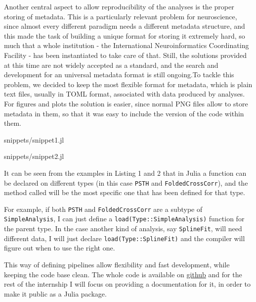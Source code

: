 Another central aspect to allow reproducibility of the analyses is the proper storing of metadata. This is a particularly relevant problem for neuroscience, since almost every different paradigm needs a different metadata structure, and this made the task of building a unique format for storing it extremely hard, so much that a whole institution - the International Neuroinformatics Coordinating Facility - has been instantiated to take care of that. Still, the solutions provided at this time are not widely accepted as a standard, and the search and development for an universal metadata format is still ongoing.To tackle this problem, we decided to keep the most flexible format for metadata, which is plain text files, usually in TOML format, associated with data produced by analyses. For figures and plots the solution is easier, since normal PNG files allow to store metadata in them, so that it was easy to include the version of the code within them.

\vspace*{40px}
\begin{minipage}{0.45\textwidth}
	\begin{lstinputlisting}[language=Python, caption=Code for peri-stimulus histogram]{snippets/snippet1.jl}
	\end{lstinputlisting}
\end{minipage}
\hfill
\begin{minipage}{0.45\textwidth}
	\begin{lstinputlisting}[language=Python, caption=Code for folded cross-correlation]{snippets/snippet2.jl}
	\end{lstinputlisting}
\end{minipage}

\vspace*{40px}
It can be seen from the examples in Listing 1 and 2 that in Julia a function can be declared on different types (in this case \texttt{PSTH} and \texttt{FoldedCrossCorr}), and the method called will be the most specific one that has been defined for that type. 

For example, if both \texttt{PSTH} and \texttt{FoldedCrossCorr} are a subtype of \texttt{SimpleAnalysis}, I can just define a \texttt{load(Type::SimpleAnalysis)} function for the parent type. In the case another kind of analysis, say \texttt{SplineFit},  will need different data, I will just declare \texttt{load(Type::SplineFit)} and the compiler will figure out when to use the right one. 

This way of defining pipelines allow flexibility and fast development, while keeping the code base clean. The whole code is available on \href{https://github.com/stebett/purkinje-cells-analysis}{github} and for the rest of the internship I will focus on providing a documentation for it, in order to make it public as a Julia package.
